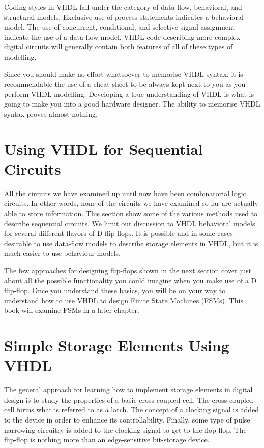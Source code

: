 Coding styles in VHDL fall under the category of data-flow, behavioral, and structural models. Exclusive use of process statements indicates a behavioral model. The use of concurrent, conditional, and selective signal assignment indicate the use of a data-flow model. VHDL code describing more complex digital circuits will generally contain both features of all of these types of modelling. 

Since you should make no effort whatsoever to memorise VHDL syntax, it is recommendable the use of a cheat sheet to be always kept next to you as you perform VHDL modelling. Developing a true understanding of VHDL is what is going to make you into a good hardware designer. The ability to memorise VHDL syntax proves almost nothing. 

\section{Using VHDL for Sequential Circuits}
All the circuits we have examined up until now have been combinatorial logic circuits. In other words, none of the circuits we have examined so far are actually able to store information. This section show some of the various methods used to describe sequential circuits. We limit our discussion to VHDL behavioral models for several different flavors of D flip-flops. It is possible and in some cases desirable to use data-flow models to describe storage elements in VHDL, but it is much easier to use behaviour models.   

The few approaches for designing flip-flops shown in the next section cover just about all the possible functionality you could imagine when you make use of a D flip-flop. Once you understand these basics, you will be on your way to understand how to use VHDL to design Finite State Machines (FSMs). This book will examine FSMs in a later chapter.

\section{Simple Storage Elements Using VHDL}
The general approach for learning how to implement storage elements in digital design is to study the properties of a basic cross-coupled cell. The cross coupled cell forms what is referred to as a latch. The concept of a clocking signal is added to the device in order to enhance its controllability. Finally, some type of pulse narrowing circuitry is added to the clocking signal to get to the flop-flop. The flip-flop is nothing more than an edge-sensitive bit-storage device.

